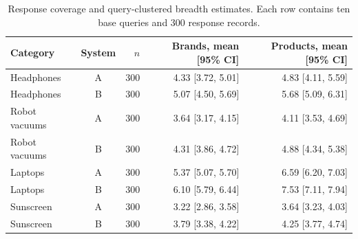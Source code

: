 \begin{table}[H]
\caption{Response coverage and query-clustered breadth estimates. Each row contains ten base queries and 300 response records.}\label{tab:coverage}
\small
\begin{tabularx}{\textwidth}{Y c r r r}
\toprule
Category & System & $n$ & Brands, mean [95\% CI] & Products, mean [95\% CI] \\
\midrule
Headphones & A & 300 & 4.33 [3.72, 5.01] & 4.83 [4.11, 5.59] \\
Headphones & B & 300 & 5.07 [4.50, 5.69] & 5.68 [5.09, 6.31] \\
Robot vacuums & A & 300 & 3.64 [3.17, 4.15] & 4.11 [3.53, 4.69] \\
Robot vacuums & B & 300 & 4.31 [3.86, 4.72] & 4.88 [4.34, 5.38] \\
Laptops & A & 300 & 5.37 [5.07, 5.70] & 6.59 [6.20, 7.03] \\
Laptops & B & 300 & 6.10 [5.79, 6.44] & 7.53 [7.11, 7.94] \\
Sunscreen & A & 300 & 3.22 [2.86, 3.58] & 3.64 [3.23, 4.03] \\
Sunscreen & B & 300 & 3.79 [3.38, 4.22] & 4.25 [3.77, 4.74] \\
\bottomrule
\end{tabularx}
\end{table}